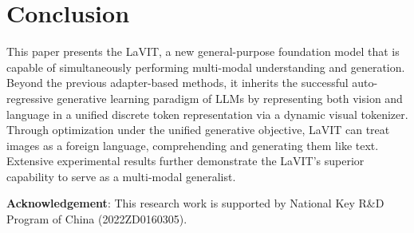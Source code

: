 \section{Conclusion}
This paper presents the LaVIT, a new general-purpose foundation model that is capable of simultaneously performing multi-modal understanding and generation. Beyond the previous adapter-based methods, it inherits the successful auto-regressive generative learning paradigm of LLMs by representing both vision and language in a unified discrete token representation via a dynamic visual tokenizer. Through optimization under the unified generative objective, LaVIT can treat images as a foreign language, comprehending and generating them like text. Extensive experimental results further demonstrate the LaVIT's superior capability to serve as a multi-modal generalist. 

\textbf{Acknowledgement}: This research work is supported by National Key R\&D Program of China (2022ZD0160305).

\clearpage

